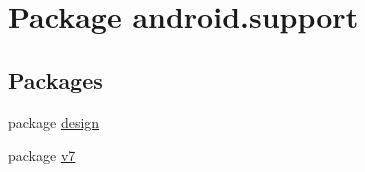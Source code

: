 \hypertarget{namespaceandroid_1_1support}{}\section{Package android.\+support}
\label{namespaceandroid_1_1support}
\subsection*{Packages}
\begin{DoxyCompactItemize}
\item 
package \hyperlink{namespaceandroid_1_1support_1_1design}{design}
\item 
package \hyperlink{namespaceandroid_1_1support_1_1v7}{v7}
\end{DoxyCompactItemize}
